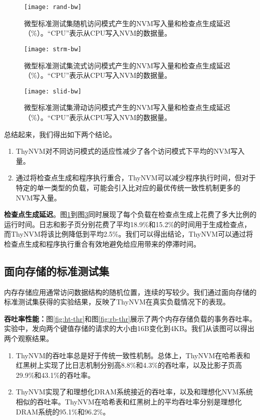 \begin{figure}[!h]
\centering
\texttt{[image: rand-bw]}\\
\caption{微型标准测试集随机访问模式产生的NVM写入量和检查点生成延迟（\%）。``CPU''表示从CPU写入NVM的数据量。}
\label{fig:rand-bw}
\end{figure}

\begin{figure}[!h]
\centering
\texttt{[image: strm-bw]}\\
\caption{微型标准测试集流式访问模式产生的NVM写入量和检查点生成延迟（\%）。``CPU''表示从CPU写入NVM的数据量。}
\label{fig:strm-bw}
\end{figure}

\begin{figure}[!h]
\centering
\texttt{[image: slid-bw]}\\
\caption{微型标准测试集滑动访问模式产生的NVM写入量和检查点生成延迟（\%）。``CPU''表示从CPU写入NVM的数据量。}
\label{fig:slid-bw}
\end{figure}

总结起来，我们得出如下两个结论。
\begin{enumerate}
\item ThyNVM对不同访问模式的适应性减少了各个访问模式下平均的NVM写入量。 
\item 通过将检查点生成和程序执行重合，ThyNVM可以减少程序执行时间，但对于特定的单一类型的负载，可能会引入比对应的最优传统一致性机制更多的NVM写入量。
\end{enumerate}

\textbf{检查点生成延迟}。图\ref{fig:rand-bw}到图\ref{fig:slid-bw}同时展现了每个负载在检查点生成上花费了多大比例的运行时间。日志和影子页分别花费了平均18.9\%和15.2\%的时间用于生成检查点，而ThyNVM将该比例降低到平均2.5\%。我们可以得出结论，ThyNVM可以通过将检查点生成和程序执行重合有效地避免给应用带来的停滞时间。

\subsection{面向存储的标准测试集}

内存存储应用通常访问数据结构的随机位置，连续的写较少。我们通过面向存储的标准测试集获得的实验结果，反映了ThyNVM在真实负载情况下的表现。

\textbf{吞吐率性能：}图\ref{fig:ht-thr}和图\ref{fig:rb-thr}展示了两个内存存储负载的事务吞吐率。实验中，发向两个键值存储的请求的大小由16B变化到4KB。我们从该图可以得出两个观察结果。
\begin{enumerate}
\item ThyNVM的吞吐率总是好于传统一致性机制。总体上，ThyNVM在哈希表和红黑树上实现了比日志机制分别高8.8\%和4.3\%的吞吐率，以及比影子页高29.9\%和43.1\%的吞吐率。
\item ThyNVM实现了和理想化DRAM系统接近的吞吐率，以及和理想化NVM系统相似的吞吐率。ThyNVM在哈希表和红黑树上的平均吞吐率分别是理想化DRAM系统的95.1\%和96.2\%。
\end{enumerate}

